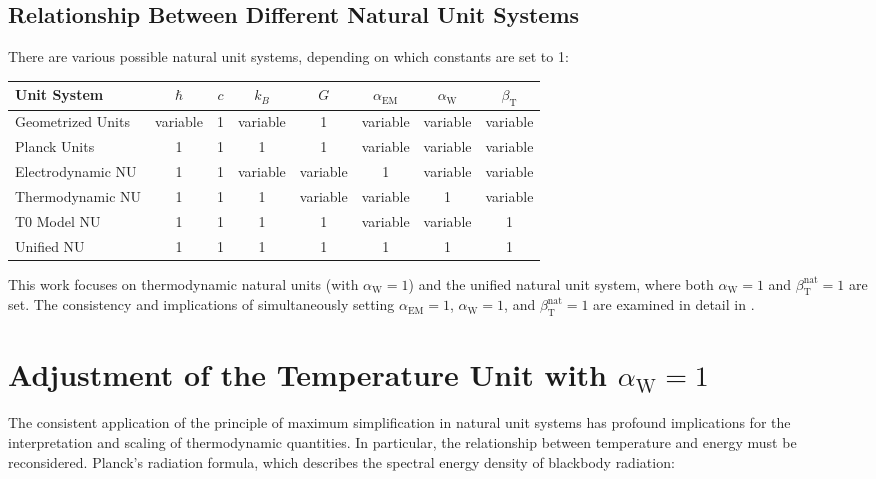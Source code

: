 \documentclass[12pt,a4paper]{article}
\newcommand{\betaT}{\beta_{\text{T}}}
\newcommand{\alphaEM}{\alpha_{\text{EM}}}
\newcommand{\alphaW}{\alpha_{\text{W}}}
\begin{document}
	\subsection{Relationship Between Different Natural Unit Systems}
	\label{subsec:unit_systems}
	
	There are various possible natural unit systems, depending on which constants are set to 1:
	
	\begin{center}
		\begin{tabular}{|l|c|c|c|c|c|c|c|}
			\hline
			\textbf{Unit System} & \(\hbar\) & \(c\) & \(k_B\) & \(G\) & \(\alphaEM\) & \(\alphaW\) & \(\betaT\) \\
			\hline
			Geometrized Units & variable & 1 & variable & 1 & variable & variable & variable \\
			Planck Units & 1 & 1 & 1 & 1 & variable & variable & variable \\
			Electrodynamic NU & 1 & 1 & variable & variable & 1 & variable & variable \\
			Thermodynamic NU & 1 & 1 & 1 & variable & variable & 1 & variable \\
			T0 Model NU & 1 & 1 & 1 & 1 & variable & variable & 1 \\
			Unified NU & 1 & 1 & 1 & 1 & 1 & 1 & 1 \\
			\hline
		\end{tabular}
	\end{center}
	
	This work focuses on thermodynamic natural units (with \(\alphaW = 1\)) and the unified natural unit system, where both \(\alphaW = 1\) and \(\betaT^{\text{nat}} = 1\) are set. The consistency and implications of simultaneously setting \(\alphaEM = 1\), \(\alphaW = 1\), and \(\betaT^{\text{nat}} = 1\) are examined in detail in \cite{pascher_alphabeta_2025}.
	
	\section{Adjustment of the Temperature Unit with \(\alphaW = 1\)}
	\label{sec:adjustment_alpha_w}
	
	The consistent application of the principle of maximum simplification in natural unit systems has profound implications for the interpretation and scaling of thermodynamic quantities. In particular, the relationship between temperature and energy must be reconsidered. Planck's radiation formula, which describes the spectral energy density of blackbody radiation:
	
\end{document}
